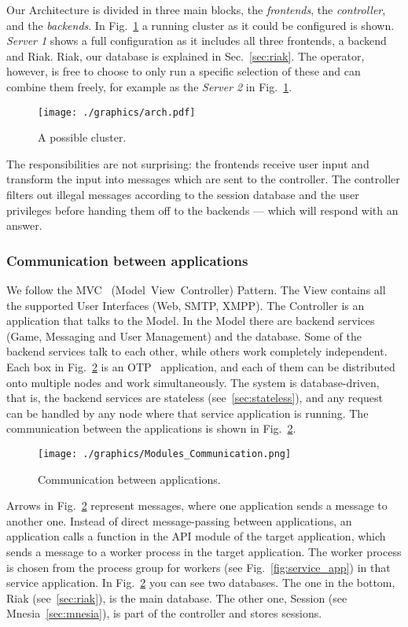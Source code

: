 \documentclass[11pt,a4paper]{report}
\begin{document}
Our Architecture is divided in three main blocks, the {\em frontends}, the
{\em controller}, and the {\em backends}. In Fig.~\ref{fig:arch} a running
cluster as it could be configured is shown. {\em Server 1} shows a full
configuration as it includes all three frontends, a backend and Riak. Riak, our
database is explained in Sec.~\ref{sec:riak}.
The operator, however, is free to choose to only run a specific selection of
these and can combine them freely, for example as the {\em Server 2} in
Fig.~\ref{fig:arch}.

\begin{figure}[h]
 \centering
 \texttt{[image: ./graphics/arch.pdf]}
 \caption{A possible cluster.}
 \label{fig:arch}
\end{figure}

The responsibilities are not surprising: the frontends receive user input and
transform the input into messages which are sent to the controller.
The controller filters out illegal messages according to the session database
and the user privileges before handing them off to the backends --- which will
respond with an answer.

\subsubsection{Communication between applications}\label{mvc}
We follow the MVC~\cite{mvc} (Model~View~Controller) Pattern.
The View contains all the supported User Interfaces (Web, SMTP, XMPP). The
Controller is an application that talks to the Model. In the Model there
are backend services (Game, Messaging and User Management) and the database.
Some of the backend services talk to each other, while others work completely
independent. Each box in Fig.~\ref{fig:mod_conn} is an OTP~\cite{erlang_otp}
application, and each of them can be distributed onto multiple nodes and work
simultaneously. The system is database-driven, that is, the backend services are
stateless (see~\ref{sec:stateless}), and any request can be handled
by any node where that service application is running. The communication between
the applications is shown in Fig.~\ref{fig:mod_conn}.

\begin{figure}[h]
 \centering
 \texttt{[image: ./graphics/Modules\_Communication.png]}
 \caption{Communication between applications.}
 \label{fig:mod_conn}
\end{figure}

Arrows in Fig.~\ref{fig:mod_conn} represent messages, where one application
sends a message to another one. Instead of direct message-passing between
applications, an application calls a function in the API module of the target
application, which sends a message to a worker process in the target application.
The worker process is chosen from the process group for workers
(see Fig.~\ref{fig:service_app}) in that service application. In
Fig.~\ref{fig:mod_conn} you can see two databases. The one in the bottom, Riak
(see~\ref{sec:riak}), is the main database. The other one, Session
(see Mnesia~\ref{sec:mnesia}), is part of the controller and stores sessions.
\end{document}
